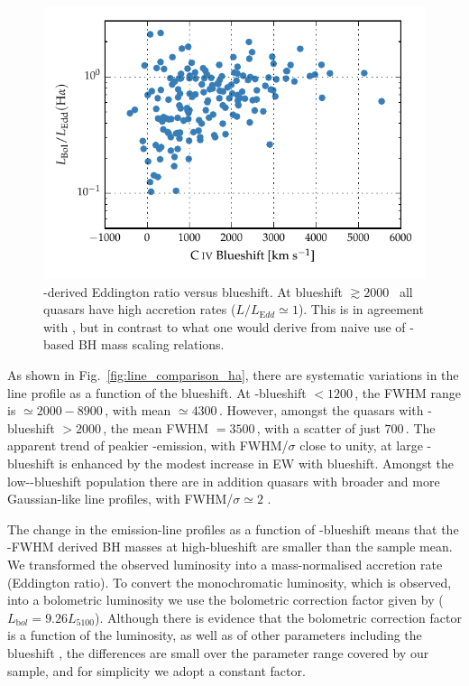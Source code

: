 \begin{figure}
    \centering
    \includegraphics[width=0.8\linewidth]{figures/chapter03/ha_edd_civ_bs.pdf}
    \caption[{\hans-derived Eddington ratio versus  blueshift.}]{\hans-derived Eddington ratio versus  blueshift. At blueshift $\gtrsim2000$ \kms\, all quasars have high accretion rates ($L/L_{\mathrm Edd} \simeq 1$). This is in agreement with \citet{kratzer15}, but in contrast to what one would derive from naive use of -based BH mass scaling relations.}
    \label{fig:ha_edd_civ_bs}
\end{figure}

As shown in Fig.~\ref{fig:line_comparison_ha}, there are systematic variations in the \ha line profile as a function of the  blueshift. 
At -blueshift $<1200$\,\kms, the \ha FWHM range is $\simeq2000 - 8900$\,\kms, with mean $\simeq4300$\,\kms.
However, amongst the quasars with -blueshift $>2000$\,\kms, the mean \ha FWHM $=3500$\,\kms, with a scatter of just $700$\,\kms. 
The apparent trend of peakier \hans-emission, with FWHM/$\sigma$ close to unity, at large -blueshift is enhanced by the modest increase in \ha EW with blueshift. 
Amongst the low--blueshift population there are in addition quasars with broader and more Gaussian-like \ha line profiles, with FWHM/$\sigma \simeq 2$ . 

The change in the \ha emission-line profiles as a function of -blueshift means that the \hans-FWHM derived BH masses at high-blueshift are smaller than the sample mean. 
We transformed the observed luminosity into a mass-normalised accretion rate (Eddington ratio).
To convert the monochromatic luminosity, which is observed, into a bolometric luminosity we use the bolometric correction factor given by \citet{richards06} ($L_{\mathrm bol} = 9.26L_{5100}$).
Although there is evidence that the bolometric correction factor is a function of the luminosity, as well as of other parameters including the  blueshift \citep{krawczyk13}, the differences are small over the parameter range covered by our sample, and for simplicity we adopt a constant factor. 

